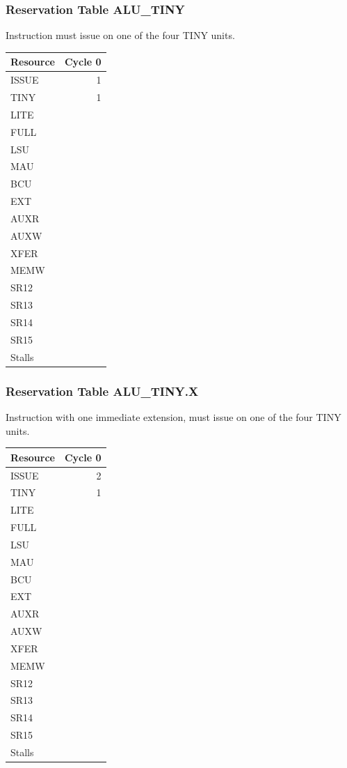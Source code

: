 \subsubsection{Reservation Table ALU\_TINY} \label{sec:reservation-ALU-TINY}

Instruction must issue on one of the four TINY units.
\medskip

\begin{tabular}{|l|r|} \hline
Resource	& Cycle 0 \\ \hline
\textsf{ISSUE}	& 1	\\
\textsf{TINY}	& 1	\\
\textsf{LITE}	& 	\\
\textsf{FULL}	& 	\\
\textsf{LSU}	& 	\\
\textsf{MAU}	& 	\\
\textsf{BCU}	& 	\\
\textsf{EXT}	& 	\\
\textsf{AUXR}	& 	\\
\textsf{AUXW}	& 	\\
\textsf{XFER}	& 	\\
\textsf{MEMW}	& 	\\
\textsf{SR12}	& 	\\
\textsf{SR13}	& 	\\
\textsf{SR14}	& 	\\
\textsf{SR15}	& 	\\
\hline Stalls	& 	\\
\hline \end{tabular}

\subsubsection{Reservation Table ALU\_TINY.X} \label{sec:reservation-ALU-TINY.X}

Instruction with one immediate extension, must issue on one of the four TINY units.
\medskip

\begin{tabular}{|l|r|} \hline
Resource	& Cycle 0 \\ \hline
\textsf{ISSUE}	& 2	\\
\textsf{TINY}	& 1	\\
\textsf{LITE}	& 	\\
\textsf{FULL}	& 	\\
\textsf{LSU}	& 	\\
\textsf{MAU}	& 	\\
\textsf{BCU}	& 	\\
\textsf{EXT}	& 	\\
\textsf{AUXR}	& 	\\
\textsf{AUXW}	& 	\\
\textsf{XFER}	& 	\\
\textsf{MEMW}	& 	\\
\textsf{SR12}	& 	\\
\textsf{SR13}	& 	\\
\textsf{SR14}	& 	\\
\textsf{SR15}	& 	\\
\hline Stalls	& 	\\
\hline \end{tabular}

